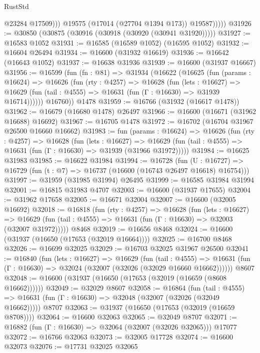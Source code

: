 \begin{lexlean}{RustStd}
\begin{coremodule}
{\begin{coremodule}
{{{{{{{{{{{{{{{{{{{{{{{{{{{{{{{{{{{{{{{{{{{{{{{{{{{{{{{                    @23284
                    @17509)))
              @19575
              (@17014 (@27704 @1394 @173))
              @19587)))))
@31926 := @30850 (@30875 (@30916 (@30918 (@30920 (@30941 @31920)))))
@31927 := @16583 @1052
@31931 := @16585 (@16589 @1052) (@16595 @1052)
@31932 := @16604 @26494
@31934 := @16600 (@31932 @16619)
@31936 := @16642 (@16643 @1052)
@31937 := @16638 @31936
@31939 := @16600 (@31937 @16667)
@31956 := @16599
    (fun (fn : @81) =>
    @31934
      (@16622
        (@16625
          (fun (params : @16624) =>
          @16626
            (fun (rty : @4257) =>
            @16628
              (fun (lets : @16627) =>
              @16629 (fun (tail : @4555) => @16631 (fun (Γ : @16630) => @31939 @16714))))))
        @16760))
    @1478
@31959 := @16766 (@31932 (@16617 @1478))
@31962 := @16679 (@16680 @1478) @26497
@31966 := @16600 (@16671 (@31962 @16688) @16692)
@31967 := @16705 @1478
@31972 := @16702 (@16704 @31967 @26500 @16660 @16662)
@31983 := fun (params : @16624) =>
  @16626
    (fun (rty : @4257) =>
    @16628
      (fun (lets : @16627) =>
      @16629 (fun (tail : @4555) => @16631 (fun (Γ : @16630) => @31939 (@31966 @31972)))))
@31984 := @16625 @31983
@31985 := @16622 @31984
@31994 := @16728
    (fun (U : @16727) => @16729 (fun (t : @7) => @16737 (@16600 (@16743 @26497 @16618) @16754)))
@31997 := @31959 (@31985 @31994) @26495
@31999 := @16585 @31984 @31994
@32001 := @16815 @31983 @4707
@32003 := @16600 (@31937 @17655)
@32004 := @31962 @17658
@32005 := @16671 @32004
@32007 := @16600 (@32005 @16692)
@32018 := @16818
    (fun (rty : @4257) =>
    @16628
      (fun (lets : @16627) =>
      @16629 (fun (tail : @4555) => @16631 (fun (Γ : @16630) => @32003 (@32007 @31972)))))
    @8468
@32019 := @16656 @8468
@32024 := @16600 (@31937 (@16650 (@17653 (@32019 @16664))))
@32025 := @16700 @8468
@32026 := @16699 @32025
@32029 := @16703 @32025 @31967 @26500
@32041 := @16840
    (fun (lets : @16627) =>
    @16629
      (fun (tail : @4555) =>
      @16631 (fun (Γ : @16630) => @32024 (@32007 (@32026 (@32029 @16660 @16662))))))
    @8607
@32048 := @16600 (@31937 (@16650 (@17653 (@32019 (@16659 (@8608 @16662))))))
@32049 := @32029 @8607
@32058 := @16864
    (fun (tail : @4555) => @16631 (fun (Γ : @16630) => @32048 (@32007 (@32026 (@32049 @16662)))))
    @8707
@32063 := @31937 (@16650 (@17653 (@32019 (@16659 @8708))))
@32064 := @16600 @32063
@32065 := @32049 @8707
@32071 := @16882 (fun (Γ : @16630) => @32064 (@32007 (@32026 @32065))) @17077
@32072 := @16766 @32063
@32073 := @32005 @17728
@32074 := @16600 @32073
@32076 := @17731 @32025 @32065
}}}}}}}}}}}}}}}}}}}}}}}}}}}}}}}}}}}}}}}}}}}}}}}}}}}}}}}
\end{coremodule}}
\end{coremodule}
\end{lexlean}
